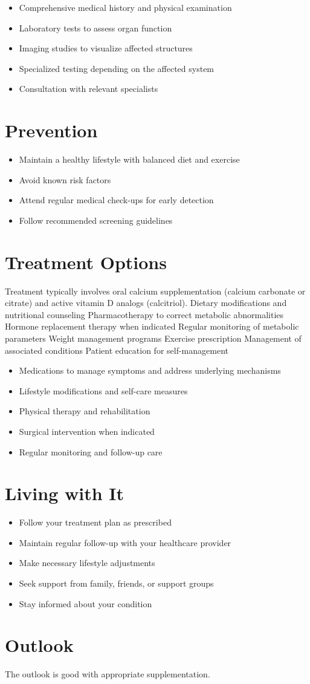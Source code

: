 \begin{itemize}[noitemsep]
  \item Comprehensive medical history and physical examination
  \item Laboratory tests to assess organ function
  \item Imaging studies to visualize affected structures
  \item Specialized testing depending on the affected system
  \item Consultation with relevant specialists
\end{itemize}
\section{Prevention}
\begin{itemize}[noitemsep]
  \item Maintain a healthy lifestyle with balanced diet and exercise
  \item Avoid known risk factors
  \item Attend regular medical check-ups for early detection
  \item Follow recommended screening guidelines
\end{itemize}
\section{Treatment Options}
Treatment typically involves oral calcium supplementation (calcium carbonate or citrate) and active vitamin D analogs (calcitriol). Dietary modifications and nutritional counseling Pharmacotherapy to correct metabolic abnormalities Hormone replacement therapy when indicated Regular monitoring of metabolic parameters Weight management programs Exercise prescription Management of associated conditions Patient education for self-management

\begin{itemize}[noitemsep]
  \item Medications to manage symptoms and address underlying mechanisms
  \item Lifestyle modifications and self-care measures
  \item Physical therapy and rehabilitation
  \item Surgical intervention when indicated
  \item Regular monitoring and follow-up care
\end{itemize}
\section{Living with It}
\begin{itemize}[noitemsep]
  \item Follow your treatment plan as prescribed
  \item Maintain regular follow-up with your healthcare provider
  \item Make necessary lifestyle adjustments
  \item Seek support from family, friends, or support groups
  \item Stay informed about your condition
\end{itemize}
\section{Outlook}
The outlook is good with appropriate supplementation.
